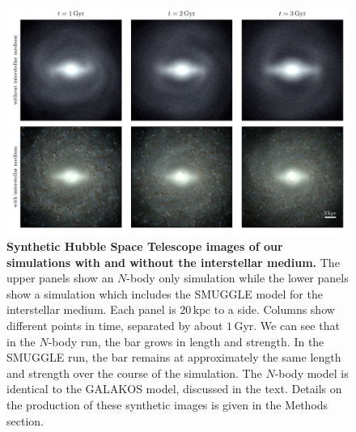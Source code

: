 \documentclass[twoside]{natureprintstyle}
\newcommand{\Nbody}{$N$-body}
\begin{document}
\begin{figure}[h!]%
\centering
\includegraphics[width=18cm]{fig/mockHST.pdf}
\caption{\textbf{Synthetic Hubble Space Telescope images of our simulations with
and without the interstellar medium.} The upper panels show an \Nbody{} only
simulation while the lower panels show a simulation which includes the SMUGGLE
model for the interstellar medium. Each panel is $20\,\textrm{kpc}$ to a side.
Columns show different points in time, separated by about $1\,\textrm{Gyr}$.
We can see that in the \Nbody{} run, the bar grows in length and strength. In
the SMUGGLE run, the bar remains at approximately the same length and strength
over the course of the simulation. The \Nbody{} model is identical to the
GALAKOS model, discussed in the text. Details on the production of these
synthetic images is given in the Methods section.}\label{fig:overview}
\end{figure}
\end{document}

